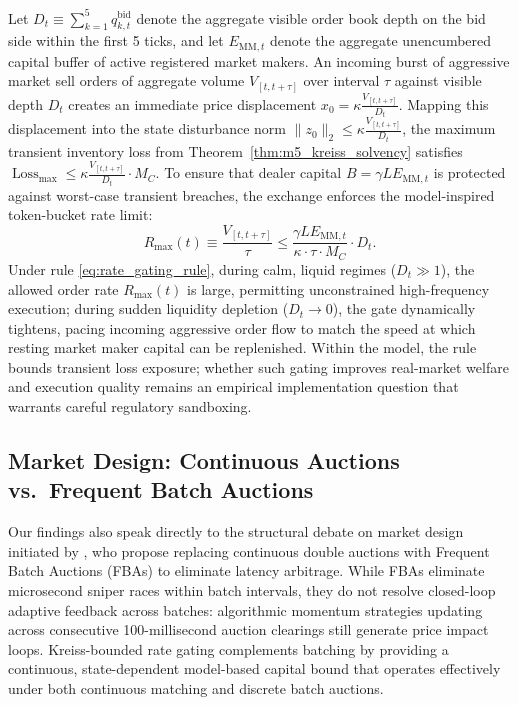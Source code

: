 \documentclass[12pt]{article}
\theoremstyle{definition}
\theoremstyle{remark}
\begin{document}
Let $D_t \equiv \sum_{k=1}^5 q_{k,t}^{\text{bid}}$ denote the aggregate visible order book depth on the bid side within the first 5 ticks, and let $E_{\text{MM}, t}$ denote the aggregate unencumbered capital buffer of active registered market makers. An incoming burst of aggressive market sell orders of aggregate volume $V_{[t, t+\tau]}$ over interval $\tau$ against visible depth $D_t$ creates an immediate price displacement $x_0 = \kappa \frac{V_{[t, t+\tau]}}{D_t}$. Mapping this displacement into the state disturbance norm $\|z_0\|_2 \le \kappa \frac{V_{[t, t+\tau]}}{D_t}$, the maximum transient inventory loss from Theorem~\ref{thm:m5_kreiss_solvency} satisfies $\operatorname{Loss}_{\max} \le \kappa \frac{V_{[t, t+\tau]}}{D_t} \cdot M_C$. To ensure that dealer capital $B = \gamma L E_{\text{MM}, t}$ is protected against worst-case transient breaches, the exchange enforces the model-inspired token-bucket rate limit:
\begin{equation}
R_{\max}(t) \equiv \frac{V_{[t, t+\tau]}}{\tau} \le \frac{\gamma L E_{\text{MM}, t}}{\kappa \cdot \tau \cdot M_C} \cdot D_t.
\label{eq:rate_gating_rule}
\end{equation}
Under rule \eqref{eq:rate_gating_rule}, during calm, liquid regimes ($D_t \gg 1$), the allowed order rate $R_{\max}(t)$ is large, permitting unconstrained high-frequency execution; during sudden liquidity depletion ($D_t \to 0$), the gate dynamically tightens, pacing incoming aggressive order flow to match the speed at which resting market maker capital can be replenished. Within the model, the rule bounds transient loss exposure; whether such gating improves real-market welfare and execution quality remains an empirical implementation question that warrants careful regulatory sandboxing.

\enlargethispage{12\baselineskip}
\subsection{Market Design: Continuous Auctions vs.\ Frequent Batch Auctions}
Our findings also speak directly to the structural debate on market design initiated by \citet{budish2015}, who propose replacing continuous double auctions with Frequent Batch Auctions (FBAs) to eliminate latency arbitrage. While FBAs eliminate microsecond sniper races within batch intervals, they do not resolve closed-loop adaptive feedback across batches: algorithmic momentum strategies updating across consecutive 100-millisecond auction clearings still generate price impact loops. Kreiss-bounded rate gating complements batching by providing a continuous, state-dependent model-based capital bound that operates effectively under both continuous matching and discrete batch auctions.
\end{document}
